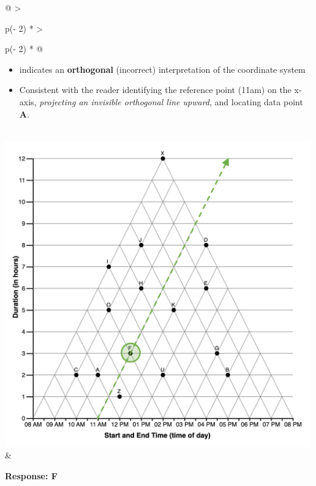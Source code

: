 \documentclass[
  letterpaper,
  DIV=11,
  numbers=noendperiod]{scrreprt}
\begin{document}
\begin{longtable}[]{@{}
  >{\raggedright\arraybackslash}p{(\columnwidth - 2\tabcolsep) * }
  >{\raggedright\arraybackslash}p{(\columnwidth - 2\tabcolsep) * }@{}}
\begin{minipage}[t]{\linewidth}
\begin{itemize}
\item
  indicates an \textbf{orthogonal} (incorrect) interpretation of the
  coordinate system
\item
  Consistent with the reader identifying the reference point (11am) on
  the x-axis, \emph{projecting an invisible orthogonal line upward}, and
  locating data point \textbf{A}.
\end{itemize}
\end{minipage} \\
\includegraphics[width=5.20833in,height=\textheight]{analysis/SGC3A/static/interpretations/Q1_111_F.png}
& \begin{minipage}[t]{\linewidth}\raggedright
\textbf{Response: F}


\end{minipage}
\end{longtable}
\end{document}
